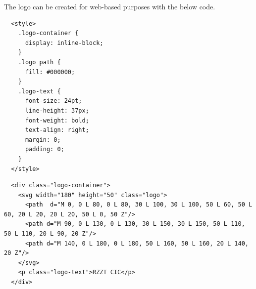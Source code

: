 \documentclass[a4paper,10pt]{article}
\begin{document}
The logo can be created for web-based purposes with the below code.

\vspace{1in}

\begin{lstlisting}
  <style>
    .logo-container {
      display: inline-block;
    }
    .logo path {
      fill: #000000;
    }
    .logo-text {
      font-size: 24pt;
      line-height: 37px;
      font-weight: bold;
      text-align: right;
      margin: 0;
      padding: 0;
    }
  </style>
\end{lstlisting}

\begin{lstlisting}
  <div class="logo-container">
    <svg width="180" height="50" class="logo">
      <path  d="M 0, 0 L 80, 0 L 80, 30 L 100, 30 L 100, 50 L 60, 50 L 60, 20 L 20, 20 L 20, 50 L 0, 50 Z"/>
      <path d="M 90, 0 L 130, 0 L 130, 30 L 150, 30 L 150, 50 L 110, 50 L 110, 20 L 90, 20 Z"/>
      <path d="M 140, 0 L 180, 0 L 180, 50 L 160, 50 L 160, 20 L 140, 20 Z"/>
    </svg>
    <p class="logo-text">RZZT CIC</p>
  </div>
\end{lstlisting}
\end{document}
